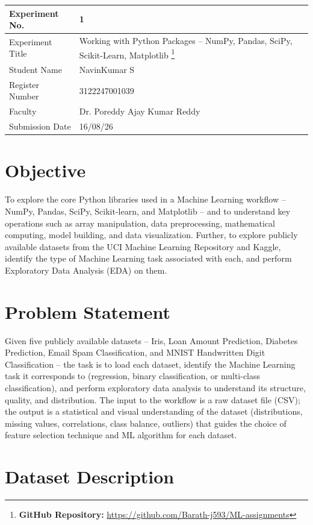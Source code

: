 \documentclass[12pt,a4paper]{article}
\begin{document}
\begin{tabular}{|p{4cm}|p{11cm}|}
\hline
Experiment No. & 1 \\ \hline
Experiment Title & Working with Python Packages -- NumPy, Pandas, SciPy, Scikit-Learn, Matplotlib
\footnote{\textbf{GitHub Repository: }\url{https://github.com/Barath-j593/ML-assignments}}\\ \hline
Student Name & NavinKumar S \\ \hline
Register Number & 3122247001039 \\ \hline
Faculty & Dr. Poreddy Ajay Kumar Reddy \\ \hline
Submission Date & 16/08/26 \\ \hline
\end{tabular}

\section{Objective}
To explore the core Python libraries used in a Machine Learning workflow -- NumPy, Pandas,
SciPy, Scikit-learn, and Matplotlib -- and to understand key operations such as array
manipulation, data preprocessing, mathematical computing, model building, and data
visualization. Further, to explore publicly available datasets from the UCI Machine Learning
Repository and Kaggle, identify the type of Machine Learning task associated with each, and
perform Exploratory Data Analysis (EDA) on them.

\section{Problem Statement}
Given five publicly available datasets -- Iris, Loan Amount Prediction, Diabetes Prediction,
Email Spam Classification, and MNIST Handwritten Digit Classification -- the task is to load
each dataset, identify the Machine Learning task it corresponds to (regression, binary
classification, or multi-class classification), and perform exploratory data analysis to
understand its structure, quality, and distribution. The input to the workflow is a raw
dataset file (CSV); the output is a statistical and visual understanding of the dataset
(distributions, missing values, correlations, class balance, outliers) that guides the choice
of feature selection technique and ML algorithm for each dataset.

\section{Dataset Description}
\end{document}
